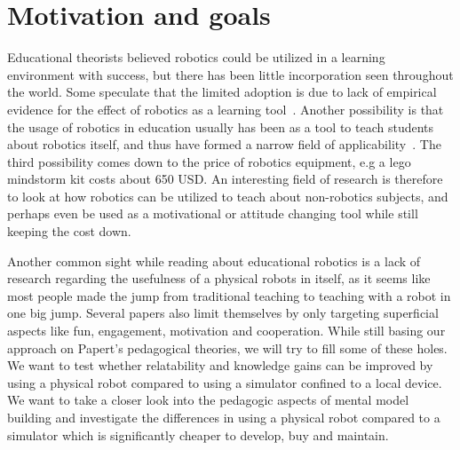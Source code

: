 

\section{Motivation and goals}
Educational theorists believed robotics could be utilized in a learning environment with success, but there has been little
incorporation seen throughout the world. 
Some speculate that the limited adoption is due to lack of empirical evidence for the effect of robotics as a learning tool~\cite{williams2007acquisition}.  
Another possibility is that the usage of robotics in education usually has been as a tool to teach students about robotics itself, 
and thus have formed a narrow field of applicability~\cite{rusk2008new}. 
The third possibility comes down to the price of robotics equipment, e.g a lego mindstorm kit costs about 650 USD. 
An interesting field of research is therefore to look at how robotics can be utilized to teach about non-robotics subjects, and perhaps even be used as a motivational or attitude changing tool while still keeping the cost down. 

\bigskip\noindent
Another common sight while reading about educational robotics is a lack of research regarding the usefulness of a physical robots in itself, as it seems like most people made the jump from traditional teaching to teaching with a robot in one big jump. 
Several papers also limit themselves by only targeting superficial aspects like fun, engagement, motivation and cooperation. 
While still basing our approach on Papert's pedagogical theories, we will try to fill some of these holes. We want to test whether relatability and knowledge gains can be improved by using a physical robot compared to using a simulator confined to a local device. 
We want to take a closer look into the pedagogic aspects of mental model building and investigate the differences in using a physical robot compared to a simulator which is significantly cheaper to develop, buy and maintain.

